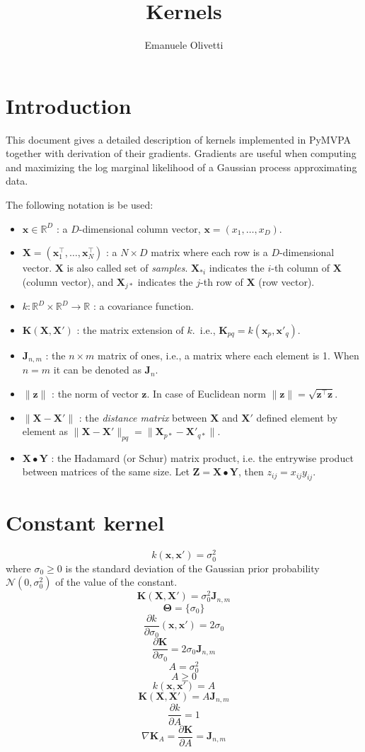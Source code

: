 \documentclass[a4paper,11pt]{article}
\title{Kernels}
\author{Emanuele Olivetti}
\newcommand\R{{\mathbb R}}
\newcommand\x{{\mathbf x}}
\newcommand\X{{\mathbf X}}
\newcommand\K{{\mathbf K}}
\newcommand\J{{\mathbf J}}
\begin{document}
\maketitle

\section{Introduction}
This document gives a detailed description of kernels implemented in
PyMVPA together with derivation of their gradients. Gradients are
useful when computing and maximizing the log marginal likelihood of a
Gaussian process approximating data.

The following notation is be used:
\begin{itemize}
\item $\x \in \R^D$ : a $D$-dimensional column vector, $\x =
  (x_1,\ldots,x_D)$.
\item $\X = (\x_1^{\top},\ldots,\x_N^{\top})$ : a $N \times D$
  matrix where each row is a $D$-dimensional vector. $\X$ is also
  called set of \emph{samples}. $\X_{* i}$ indicates the $i$-th
  column of $\X$ (column vector), and $\X_{j *}$ indicates the
  $j$-th row of $\X$ (row vector).
\item $k: \R^D \times \R^D \rightarrow \R$ : a covariance function.
\item $\K(\X,\X')$ : the matrix extension of $k$.\, i.e., $\K_{pq} =
  k(\x_p,\x'_q)$.
\item $\J_{n,m}$ : the $n \times m$ matrix of ones, i.e., a matrix
  where each element is 1. When $n = m$ it can be denoted as $\J_n$.
\item $\|\mathbf{z}\|$ : the norm of vector $\mathbf{z}$. In case of
  Euclidean norm $\|\mathbf{z}\| =
  \sqrt{\mathbf{z}^{\top}\mathbf{z}}$.
\item $\|\X-\X'\|$ : the \emph{distance matrix} between $\X$ and $\X'$
  defined element by element as $\|\X-\X'\|_{pq} = \|\X_{p *} -
  \X'_{q *}\|$.
\item $\X \bullet \mathbf{Y}$ : the Hadamard (or Schur) matrix
  product, i.e. the entrywise product between matrices of the same
  size. Let $\mathbf{Z} = \X \bullet \mathbf{Y}$, then $z_{ij} =
  x_{ij} y_{ij}$.
\end{itemize}

\section{Constant kernel}
$$k(\x,\x') = \sigma_0^2$$
where $\sigma_0 \ge 0$ is the standard deviation of the Gaussian prior
probability $\mathcal{N}(0,\sigma_0^2)$ of the value of the constant.
$$\K(\X,\X') = \sigma_0^2 \J_{n,m}$$
$$\mathbf{\Theta} = \{\sigma_0\}$$
$$\frac{\partial k}{\partial \sigma_0}(\x,\x') = 2\sigma_0$$
$$\frac{\partial \K}{\partial \sigma_0} = 2\sigma_0 \J_{n,m}$$
$$A = \sigma_0^2$$
$$A \ge 0$$
$$k(\x,\x') = A$$
$$\K(\X,\X') = A \J_{n,m}$$
$$\frac{\partial k}{\partial A} = 1$$
$$\nabla \K_A = \frac{\partial \K}{\partial A} = \J_{n,m}$$
\end{document}
